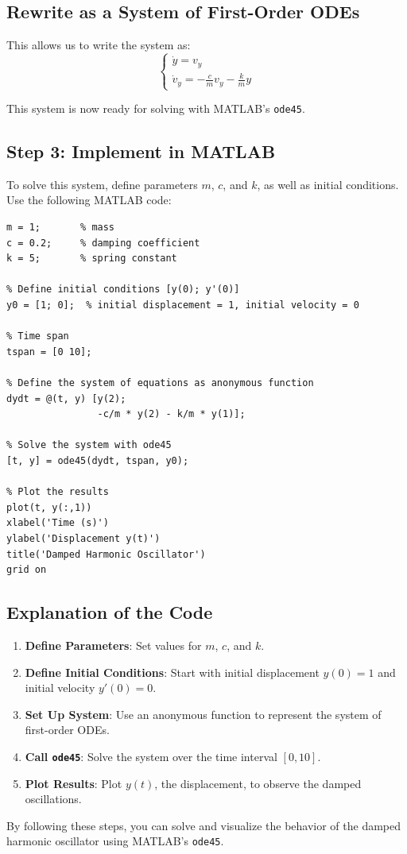 \documentclass{article}
\begin{document}
\subsection*{Rewrite as a System of First-Order ODEs}

This allows us to write the system as:
\[
\begin{cases}
\dot{y} = v_y \\
\dot{v}_y = -\frac{c}{m} v_y - \frac{k}{m} y
\end{cases}
\]

This system is now ready for solving with MATLAB’s \texttt{ode45}.

\subsection*{Step 3: Implement in MATLAB}

To solve this system, define parameters \( m \), \( c \), and \( k \), as well as initial conditions. Use the following MATLAB code:

\begin{lstlisting}[style=Matlab-editor]
% Define parameters
m = 1;       % mass
c = 0.2;     % damping coefficient
k = 5;       % spring constant

% Define initial conditions [y(0); y'(0)]
y0 = [1; 0];  % initial displacement = 1, initial velocity = 0

% Time span
tspan = [0 10];

% Define the system of equations as anonymous function
dydt = @(t, y) [y(2);
                -c/m * y(2) - k/m * y(1)];

% Solve the system with ode45
[t, y] = ode45(dydt, tspan, y0);

% Plot the results
plot(t, y(:,1))
xlabel('Time (s)')
ylabel('Displacement y(t)')
title('Damped Harmonic Oscillator')
grid on
\end{lstlisting}

\subsection*{Explanation of the Code}

\begin{enumerate}
    \item \textbf{Define Parameters}: Set values for \( m \), \( c \), and \( k \).
    \item \textbf{Define Initial Conditions}: Start with initial displacement \( y(0) = 1 \) and initial velocity \( y'(0) = 0 \).
    \item \textbf{Set Up System}: Use an anonymous function to represent the system of first-order ODEs.
    \item \textbf{Call \texttt{ode45}}: Solve the system over the time interval \([0, 10]\).
    \item \textbf{Plot Results}: Plot \( y(t) \), the displacement, to observe the damped oscillations.
\end{enumerate}

By following these steps, you can solve and visualize the behavior of the damped harmonic oscillator using MATLAB’s \texttt{ode45}.
\end{document}
